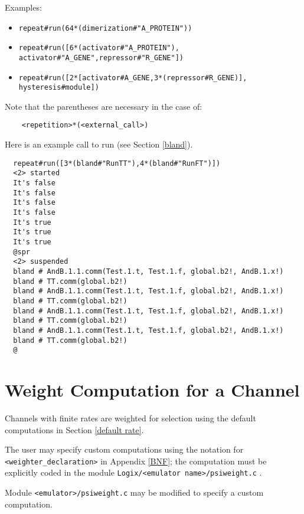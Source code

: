 \noindent
Examples:

\begin{itemize}
\item
\verb+repeat#run(64*(dimerization#"A_PROTEIN"))+
\item
\verb+repeat#run([6*(activator#"A_PROTEIN"),+ \linebreak
\verb+            activator#"A_GENE",repressor#"R_GENE"])+
\item
\verb+repeat#run([2*[activator#A_GENE,3*(repressor#R_GENE)],+ \linebreak
\verb+            hysteresis#module])+
\end{itemize}

\noindent
Note that the parentheses are necessary in the case of:

\begin{verbatim}
    <repetition>*(<external_call>)
\end{verbatim}

\noindent
Here is an example call to run (see Section \ref{bland}).

\begin{verbatim}
  repeat#run([3*(bland#"RunTT"),4*(bland#"RunFT")]) 
  <2> started
  It's false
  It's false
  It's false
  It's false
  It's true
  It's true
  It's true
  @spr
  <2> suspended
  bland # AndB.1.1.comm(Test.1.t, Test.1.f, global.b2!, AndB.1.x!)
  bland # TT.comm(global.b2!)
  bland # AndB.1.1.comm(Test.1.t, Test.1.f, global.b2!, AndB.1.x!)
  bland # TT.comm(global.b2!)
  bland # AndB.1.1.comm(Test.1.t, Test.1.f, global.b2!, AndB.1.x!)
  bland # TT.comm(global.b2!)
  bland # AndB.1.1.comm(Test.1.t, Test.1.f, global.b2!, AndB.1.x!)
  bland # TT.comm(global.b2!)
  @
\end{verbatim}

\section{Weight Computation for a Channel}
Channels with finite rates are weighted for selection using the
default computations in Section \ref{default rate}.

\noindent
The user may specify custom computations using the notation for\linebreak
\verb+<weighter_declaration>+
in Appendix \ref{BNF}; the computation must be explicitly coded in the module
\verb+Logix/<emulator name>/psiweight.c+ .

\noindent
Module \verb+<emulator>/psiweight.c+ may be modified to
specify a custom computation.


